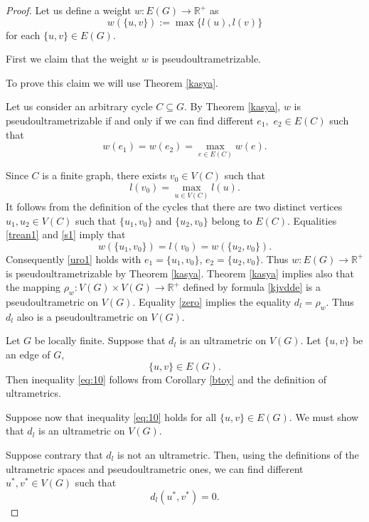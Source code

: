 \documentclass[10pt,a4paper]{amsart}
\begin{document}
 \begin{proof}


Let us define a weight
\(
w : E(G) \to \mathbb{R}^+
\)
as
\begin{equation}
    \label{trean1}
w(\{u,v\}) := \max \{ l(u), l(v) \}
\end{equation}
for each $\{u,v\} \in E(G).$

First we claim that the weight $w$ is pseudoultrametrizable.

To prove this claim we will use Theorem \ref{kasya}.

Let us consider an arbitrary cycle $C \subseteq G.$
By Theorem \ref{kasya}, $w$ is pseudoultrametrizable if and only if we can find
different $e_1,$ $e_2 \in E(C)$ such that
\begin{equation}
    \label{uro1}
w(e_1) = w(e_2) = \max_{e \in E(C)} w(e).
\end{equation}




Since $C$ is a finite graph, there exists $v_0 \in V(C)$ such that
\begin{equation}
    \label{s1}
l(v_0) = \max_{u \in V(C)} l(u). 
\end{equation}
It follows from the definition of the cycles that there are two distinct vertices $u_1, u_2 \in V(C)$ such that $\{u_1, v_0\}$ and $\{u_2, v_0\}$ belong to $E(C)$. Equalities \eqref{trean1} and \eqref{s1} imply that
\[
w(\{u_1, v_0\}) = l(v_0) = w(\{u_2, v_0\}).
\]
Consequently \eqref{uro1} holds with $e_1 = \{u_1, v_0\}$, $e_2 = \{u_2, v_0\}$.
Thus $w : E(G) \to \mathbb{R}^+$ is pseudoultrametrizable by Theorem \ref{kasya}.
Theorem \ref{kasya} implies also that the mapping $\rho_w : V(G) \times V(G) \to \mathbb{R}^+$ 
defined by formula \eqref{kjvdde} is a pseudoultrametric on $V(G)$. 
Equality \eqref{zero} implies the equality $d_l=\rho_w$. Thus $d_l$ also is a pseudoultrametric on $V(G)$.



 Let $G$ be locally finite.
 Suppose that $d_l$ is an ultrametric on $V(G)$.
Let $\{u,v\}$ be an edge of $G$, 
\begin{equation*}
\{u,v\} \in E(G).
\end{equation*}
Then inequality \eqref{eq:10}  follows from Corollary \ref{btoy} and the definition of ultrametrics.

Suppose now that inequality \eqref{eq:10} holds for all $\{u,v\} \in E(G).$
We must show that $d_l$ is an ultrametric on $V(G).$

Suppose contrary that $d_l$ is not an ultrametric.
Then, using the definitions of the ultrametric spaces and pseudoultrametric ones, we can find different $u^*, v^* \in V(G)$ such that
\begin{equation}
\label{s4}
d_l(u^*,v^*)=0.
\end{equation}



\end{proof}
\end{document}
